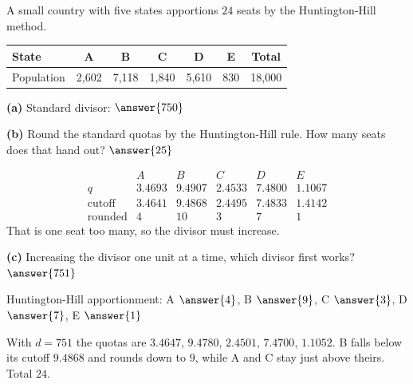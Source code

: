 \documentclass[12pt]{ximera}
\begin{document}
\begin{problem}
A small country with five states apportions $24$ seats by the Huntington-Hill method.
\begin{center}
\begin{tabular}{l|cccccc}
State & A & B & C & D & E & Total\\\hline
Population & 2,602 & 7,118 & 1,840 & 5,610 & 830 & 18,000
\end{tabular}
\end{center}

\begin{prompt}
\textbf{(a)} Standard divisor: $\answer{750}$
\end{prompt}

\begin{prompt}
\textbf{(b)} Round the standard quotas by the Huntington-Hill rule. How many seats does
that hand out? $\answer{25}$
\begin{feedback}
\[
\begin{array}{lccccc}
 & A & B & C & D & E\\
q & 3.4693 & 9.4907 & 2.4533 & 7.4800 & 1.1067\\
\text{cutoff} & 3.4641 & 9.4868 & 2.4495 & 7.4833 & 1.4142\\
\text{rounded} & 4 & 10 & 3 & 7 & 1
\end{array}
\]
That is one seat too many, so the divisor must increase.
\end{feedback}
\end{prompt}

\begin{prompt}
\textbf{(c)} Increasing the divisor one unit at a time, which divisor first works?
$\answer{751}$

\smallskip
Huntington-Hill apportionment: A $\answer{4}$, B $\answer{9}$, C $\answer{3}$,
D $\answer{7}$, E $\answer{1}$
\begin{feedback}
With $d=751$ the quotas are $3.4647$, $9.4780$, $2.4501$, $7.4700$, $1.1052$. B falls below
its cutoff $9.4868$ and rounds down to $9$, while A and C stay just above theirs. Total
$24$. \checkmark
\end{feedback}
\end{prompt}
\end{problem}
\end{document}
